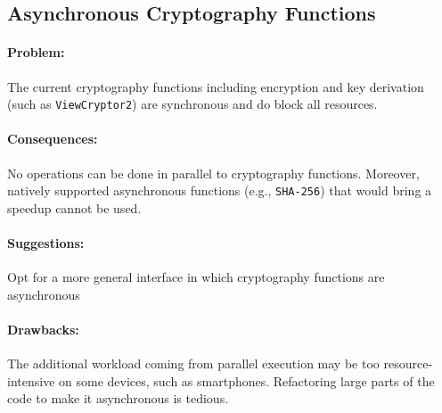 \subsection{Asynchronous Cryptography Functions}

\paragraph{Problem:}
The current cryptography functions including encryption and key derivation (such as \texttt{ViewCryptor2}) are synchronous and do block all resources.

\paragraph{Consequences:}
No operations can be done in parallel to cryptography functions.
Moreover, natively supported asynchronous functions (e.g., \texttt{SHA-256}) that would bring a speedup cannot be used.

\paragraph{Suggestions:}
Opt for a more general interface in which cryptography functions are asynchronous

\paragraph{Drawbacks:}
The additional workload coming from parallel execution may be too resource-intensive on some devices, such as smartphones.
Refactoring large parts of the code to make it asynchronous is tedious.
